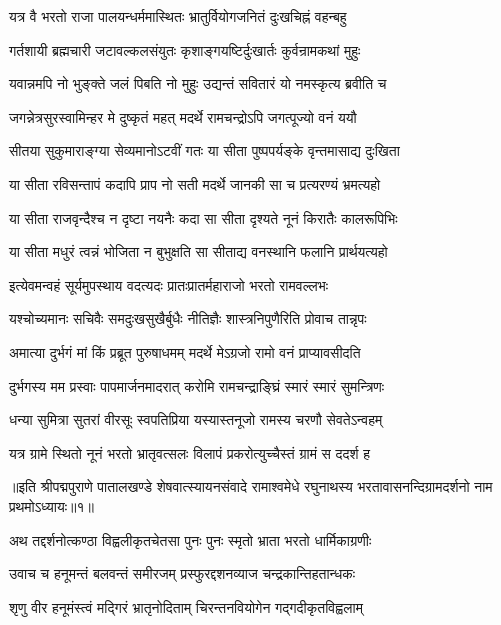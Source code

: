 \twolineshloka
{यत्र वै भरतो राजा पालयन्धर्ममास्थितः}
{भ्रातुर्वियोगजनितं दुःखचिह्नं वहन्बहु}%

\twolineshloka
{गर्तशायी ब्रह्मचारी जटावल्कलसंयुतः}
{कृशाङ्गयष्टिर्दुःखार्तः कुर्वन्रामकथां मुहुः}%

\twolineshloka
{यवान्नमपि नो भुङ्क्ते जलं पिबति नो मुहुः}
{उद्यन्तं सवितारं यो नमस्कृत्य ब्रवीति च}%

\twolineshloka
{जगन्नेत्रसुरस्वामिन्हर मे दुष्कृतं महत्}
{मदर्थे रामचन्द्रोऽपि जगत्पूज्यो वनं ययौ}%

\twolineshloka
{सीतया सुकुमाराङ्ग्या सेव्यमानोऽटवीं गतः}
{या सीता पुष्पपर्यङ्के वृन्तमासाद्य दुःखिता}%

\twolineshloka
{या सीता रविसन्तापं कदापि प्राप नो सती}
{मदर्थे जानकी सा च प्रत्यरण्यं भ्रमत्यहो}%

\twolineshloka
{या सीता राजवृन्दैश्च न दृष्टा नयनैः कदा}
{सा सीता दृश्यते नूनं किरातैः कालरूपिभिः}%

\twolineshloka
{या सीता मधुरं त्वन्नं भोजिता न बुभुक्षति}
{सा सीताद्य वनस्थानि फलानि प्रार्थयत्यहो}%

\twolineshloka
{इत्येवमन्वहं सूर्यमुपस्थाय वदत्यदः}
{प्रातःप्रातर्महाराजो भरतो रामवल्लभः}%

\twolineshloka
{यश्चोच्यमानः सचिवैः समदुःखसुखैर्बुधैः}
{नीतिज्ञैः शास्त्रनिपुणैरिति प्रोवाच तान्नृपः}%

\twolineshloka
{अमात्या दुर्भगं मां किं प्रब्रूत पुरुषाधमम्}
{मदर्थे मेऽग्रजो रामो वनं प्राप्यावसीदति}%

\twolineshloka
{दुर्भगस्य मम प्रस्वाः पापमार्जनमादरात्}
{करोमि रामचन्द्राङ्घ्रिं स्मारं स्मारं सुमन्त्रिणः}%

\twolineshloka
{धन्या सुमित्रा सुतरां वीरसूः स्वपतिप्रिया}
{यस्यास्तनूजो रामस्य चरणौ सेवतेऽन्वहम्}%

\twolineshloka
{यत्र ग्रामे स्थितो नूनं भरतो भ्रातृवत्सलः}
{विलापं प्रकरोत्युच्चैस्तं ग्रामं स ददर्श ह}%

॥इति श्रीपद्मपुराणे पातालखण्डे शेषवात्स्यायनसंवादे रामाश्वमेधे रघुनाथस्य भरतावासनन्दिग्रामदर्शनो नाम प्रथमोऽध्यायः॥१॥



\twolineshloka
{अथ तद्दर्शनोत्कण्ठा विह्वलीकृतचेतसा}
{पुनः पुनः स्मृतो भ्राता भरतो धार्मिकाग्रणीः}%

\twolineshloka
{उवाच च हनूमन्तं बलवन्तं समीरजम्}
{प्रस्फुरद्दशनव्याज चन्द्रकान्तिहतान्धकः}%

\twolineshloka
{शृणु वीर हनूमंस्त्वं मद्गिरं भ्रातृनोदिताम्}
{चिरन्तनवियोगेन गद्गदीकृतविह्वलाम्}%

